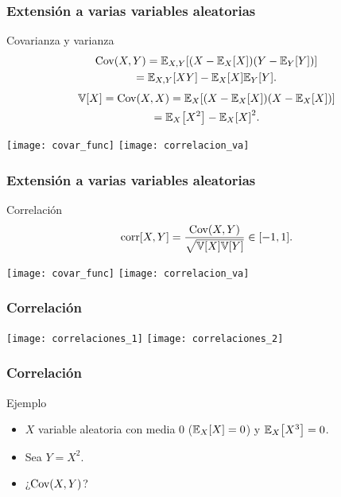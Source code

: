 \documentclass[table]{beamer}
\begin{document}
\begin{frame}
    \frametitle{Extensión a varias variables aleatorias}
    \begin{block}{Covarianza y varianza}
        \begin{multline*}
            \cov{X, Y} = \expecteddist{X , Y}{\parens{X - \expecteddist{X}{X}} \parens{Y - \expecteddist{Y}{Y}}}
            \\
            = \expecteddist{X, Y}{X Y} - \expecteddist{X}{X} \expecteddist{Y}{Y} .
        \end{multline*}
        \begin{multline*}
            \variance{X} = \cov{X, X} = \expecteddist{X}{\parens{X - \expecteddist{X}{X}} \parens{X - \expecteddist{X}{X}}}
            \\
            = \expecteddist{X}{X^{2}} - \expecteddist{X}{X}^{2} .
        \end{multline*}
    \end{block}
    \begin{center}
        \texttt{[image: covar\_func]}
        \texttt{[image: correlacion\_va]}
    \end{center}
\end{frame}

\begin{frame}
    \frametitle{Extensión a varias variables aleatorias}
    \begin{block}{Correlación}
        \begin{equation*}
            \corr{X , Y} = \frac{\cov{X , Y}}{\sqrt{\variance{X} \variance{Y}}} \in \sparens{-1 , 1} .
        \end{equation*}
    \end{block}
    \begin{center}
        \texttt{[image: covar\_func]}
        \texttt{[image: correlacion\_va]}
    \end{center}
\end{frame}


\begin{frame}
    \frametitle{Correlación}
    \begin{center}
        \texttt{[image: correlaciones\_1]}
        \texttt{[image: correlaciones\_2]}
    \end{center}
\end{frame}

\begin{frame}
    \frametitle{Correlación}
    \begin{block}{Ejemplo}
        \begin{itemize}
            \item $X$ variable aleatoria con media $0$ ($\expecteddist{X}{X} = 0$) y $\expecteddist{X}{X^{3}} = 0$.
            \item Sea $Y = X^{2}$.
            \item ¿$\cov{X , Y}$?
        \end{itemize}
    \end{block}
\end{frame}
\end{document}
